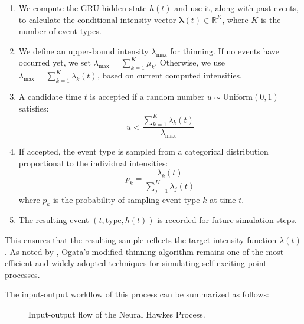 \begin{enumerate}
    \item We compute the GRU hidden state \( h(t) \) and use it, along with past events, to calculate the conditional intensity vector \( \boldsymbol{\lambda}(t) \in \mathbb{R}^K \), where \( K \) is the number of event types.
    
    \item We define an upper-bound intensity \( \lambda_{\text{max}} \) for thinning. If no events have occurred yet, we set \( \lambda_{\text{max}} = \sum_{k=1}^{K} \mu_k \). Otherwise, we use \( \lambda_{\text{max}} = \sum_{k=1}^{K} \lambda_k(t) \), based on current computed intensities.

    \item A candidate time \( t \) is accepted if a random number \( u \sim \text{Uniform}(0,1) \) satisfies:
    \[
    u < \frac{\sum_{k=1}^{K} \lambda_k(t)}{\lambda_{\text{max}}}
    \]
    
    \item If accepted, the event type is sampled from a categorical distribution proportional to the individual intensities:
    \[
    p_k = \frac{\lambda_k(t)}{\sum_{j=1}^{K} \lambda_j(t)}
    \]
    where \( p_k \) is the probability of sampling event type \( k \) at time \( t \).

    \item The resulting event \( (t, \text{type}, h(t)) \) is recorded for future simulation steps.
\end{enumerate}
This ensures that the resulting sample reflects the target intensity function \( \lambda(t) \). As noted by \citet{magris2019simulationhawkesprocesslambertw}, Ogata's modified thinning algorithm remains one of the most efficient and widely adopted techniques for simulating self-exciting point processes.

The input-output workflow of this process can be summarized as follows:
\begin{figure}[H]
\centering
{}
\caption{Input-output flow of the Neural Hawkes Process.}
\label{fig:neural-hawkes-flow}
\end{figure}

